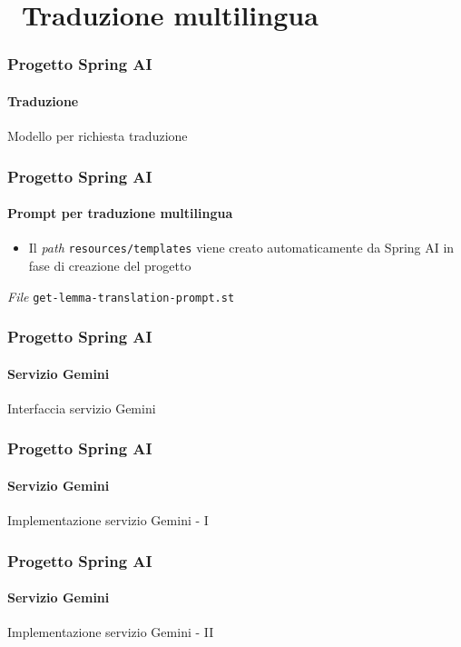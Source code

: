 \section{\faWrench\ Traduzione multilingua} %
\label{sec:spring-ai-gemini-zero-implicit-prompting-translation}
%
\begin{frame}[t,fragile] \frametitle{Progetto Spring AI}
    \framesubtitle{Traduzione}
        \begin{block}{Modello per richiesta traduzione}
			{\tiny}
    	\end{block}
\end{frame}
%
\begin{frame}[t,fragile] \frametitle{Progetto Spring AI}
    \framesubtitle{Prompt per traduzione multilingua}
        \begin{itemize}[leftmargin=10pt,align=right]
		    \item[\alert{\faExclamationTriangle}] Il \textit{path} \texttt{resources/templates} viene creato automaticamente da Spring AI in fase di creazione del progetto
        \end{itemize}
        \begin{block}{\textit{File} \texttt{get-lemma-translation-prompt.st}}
			{\scriptsize}
    	\end{block}
\end{frame}
%
\begin{frame}[t,fragile] \frametitle{Progetto Spring AI}
    \framesubtitle{Servizio Gemini}
        \begin{block}{Interfaccia servizio Gemini}
{\tiny}
    \end{block}
\end{frame}
%
\begin{frame}[t,fragile] \frametitle{Progetto Spring AI}
    \framesubtitle{Servizio Gemini}
		\vspace*{-.7cm}
        \begin{block}{Implementazione servizio Gemini - I}
            {\tiny}
    \end{block}
\end{frame}
%
\begin{frame}[t,fragile] \frametitle{Progetto Spring AI}
    \framesubtitle{Servizio Gemini}
    	\vspace*{-.7cm}
        \begin{block}{Implementazione servizio Gemini - II}
            {\tiny}
    \end{block}
\end{frame}
